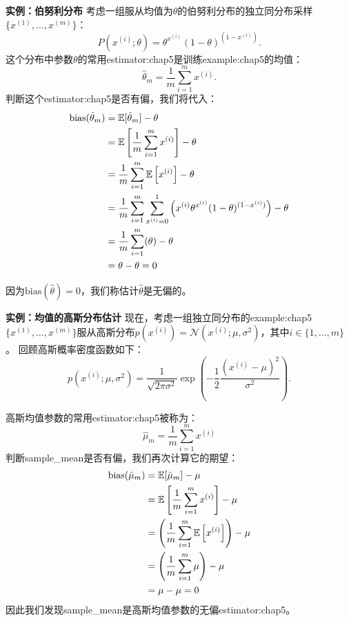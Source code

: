 \textbf{实例：伯努利分布}\quad 
考虑一组服从均值为$\theta$的伯努利分布的独立同分布采样$\{x^{(1)}, \dots , x^{(m)}\}$：
\begin{equation}
    P(x^{(i)}; \theta) = \theta^{x^{(i)}} (1-\theta)^{(1 - x^{(i)})}.
\end{equation}
这个分布中参数$\theta$的常用\gls{estimator:chap5}是训练\gls{example:chap5}的均值：
\begin{equation}
\label{eq:5.22}
    \hat{\theta}_m = \frac{1}{m} \sum_{i=1}^m x^{(i)}.
\end{equation}
判断这个\gls{estimator:chap5}是否有偏，我们将代入：
\begin{align}
    \text{bias}(\hat{\theta}_m)     &= \mathbb{E}[\hat{\theta}_m] - \theta  \\
            &= \mathbb{E} \left[ \frac{1}{m} \sum_{i=1}^m x^{(i)} \right] - \theta \\
            &= \frac{1}{m} \sum_{i=1}^m \mathbb{E} \left[x^{(i)} \right] - \theta \\
            &= \frac{1}{m} \sum_{i=1}^m \sum_{x^{(i)} = 0}^1 \left( x^{(i)} \theta^{x^{(i)}} (1-\theta)^{(1-x^{(i)})} \right) - \theta \\
            &= \frac{1}{m} \sum_{i=1}^m (\theta) - \theta \\
            &= \theta - \theta = 0
\end{align}

因为$\text{bias}(\hat{\theta})=0$，我们称估计$\hat{\theta}$是无偏的。

\textbf{实例：均值的高斯分布估计}\quad 
现在，考虑一组独立同分布的\gls{example:chap5}$\{x^{(1)}, \dots , x^{(m)}\}$服从高斯分布$p(x^{(i)}) = \mathcal{N}(x^{(i)}; \mu, \sigma^2)$，其中$i\in\{1, \dots, m\}$。
回顾高斯概率密度函数如下：
\begin{equation}
    p(x^{(i)}; \mu, \sigma^2) = \frac{1}{\sqrt{2\pi\sigma^2}} \exp\left( -\frac{1}{2} \frac{(x^{(i)} - \mu)^2}{\sigma^2}  \right).
\end{equation}

高斯均值参数的常用\gls{estimator:chap5}被称为：
\begin{equation}
    \hat{\mu}_m = \frac{1}{m} \sum_{i=1}^m x^{(i)}
\end{equation}
判断\gls{sample_mean}是否有偏，我们再次计算它的期望：
\begin{align}
\text{bias} (\hat{\mu}_m) &= \mathbb{E}[ \hat{\mu}_m ]  - \mu \\
    &= \mathbb{E} \left[ \frac{1}{m} \sum_{i=1}^m x^{(i)}  \right] - \mu \\
    &= \left( \frac{1}{m}\sum_{i=1}^m \mathbb{E} \left[ x^{(i)} \right] \right) - \mu \\
    &= \left( \frac{1}{m}\sum_{i=1}^m \mu \right) - \mu \\
    &= \mu - \mu = 0
\end{align}
因此我们发现\gls{sample_mean}是高斯均值参数的无偏\gls{estimator:chap5}。

